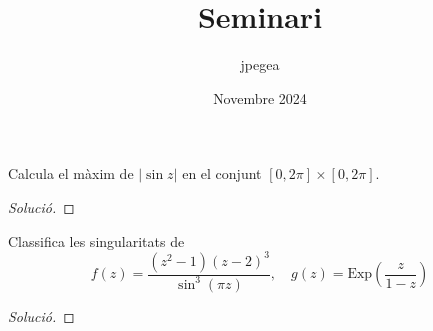 \documentclass{article}
\title{Seminari}
\author{jpegea}
\date{Novembre 2024}
\renewcommand\exp{\mathrm{Exp}}
\begin{document}
\maketitle

\begin{probapartat}
  Calcula el màxim de $\left|\sin z \right|$ en el conjunt
  $[0, 2\pi] \times [0, 2\pi]$.
\end{probapartat}

\begin{proof}[Solució]
  \lipsum[1-3]
\end{proof}

\begin{apartat}
  Classifica les singularitats de
  \begin{equation*}
    f(z) =
    \frac{(z^2-1)(z-2)^3}{\sin^3(\pi z)}, \quad
    g(z) =
    \exp\left( \frac{z}{1-z} \right)
  \end{equation*}
\end{apartat}

\begin{proof}[Solució]
  \lipsum[4-5]
\end{proof}
\end{document}
